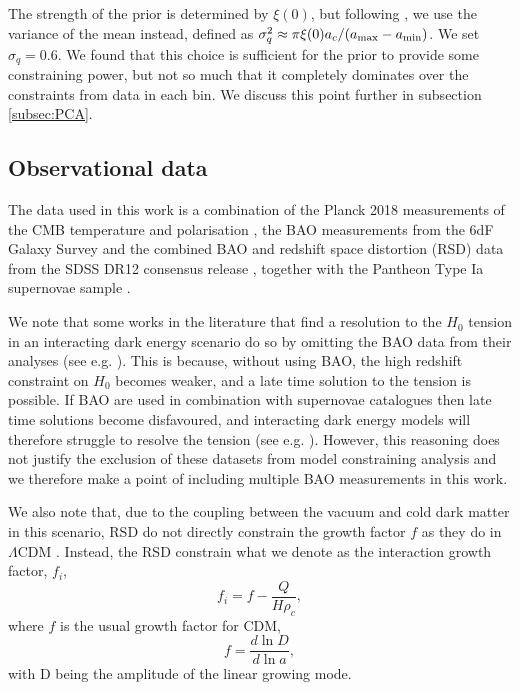 \documentclass[final,3p,times,twocolumn]{elsarticle}
\begin{document}
The strength of the prior is determined by $\xi(0)$, but following \cite{Wang:2015wga}, we use the variance of the mean instead, defined as $\sigma^2_{q} \approx \pi \xi(0) a_c / (a_{\rm max}- a_{\rm min})$. We set $\sigma_q = 0.6$. We found that this choice is sufficient for the prior to provide some constraining power, but not so much that it completely dominates over the constraints from data in each bin. We discuss this point further in subsection \ref{subsec:PCA}.

\subsection{Observational data} \label{subsec:data}
The data used in this work is a combination of the Planck 2018 measurements of the CMB temperature and polarisation \citep{Aghanim:2018eyx}, the BAO measurements from the 6dF Galaxy Survey \citep{Beutler2011} and the combined  BAO and redshift space distortion (RSD) data from the SDSS DR12 consensus release \citep{Alam:2016hwk}, together with the Pantheon Type Ia supernovae sample \citep{Scolnic:2017caz}.

We note that some works in the literature that find a resolution to the $H_0$ tension in an interacting dark energy scenario do so by omitting the BAO data from their analyses (see e.g. \cite{diValentino2019}). This is because, without using BAO, the high redshift constraint on $H_0$ becomes weaker, and a late time solution to the tension is possible. If BAO are used in combination with supernovae catalogues then late time solutions become disfavoured, and interacting dark energy models will therefore struggle to resolve the tension (see e.g. \cite{Poulin:2018zxs,Martinelli:2019krf}). However, this reasoning does not justify the exclusion of these datasets from model constraining analysis and we therefore make a point of including multiple BAO measurements in this work.

We also note that, due to the coupling between the vacuum and cold dark matter in this scenario, RSD do not directly constrain the growth factor $f$ as they do in $\Lambda$CDM \cite{Martinelli:2019krf, Borges:2017jvi}. Instead, the RSD constrain what we denote as the interaction growth factor, $f_i$,
\begin{equation}
    f_i = f - \frac{Q}{H \rho_c},
\end{equation}
where $f$ is the usual growth factor for CDM,
\begin{equation}
    f = \frac{d \ln D}{d \ln a},
\end{equation}
with D being the amplitude of the linear growing mode.
\end{document}
